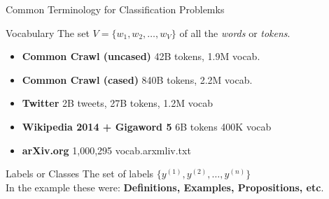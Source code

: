 \documentclass[9pt]{beamer}
\begin{document}
\begin{frame}{Common Terminology for Classification Problemks}
    \begin{exampleblock}{Vocabulary}
        The set $V = \{w_1,w_2,\ldots, w_V\}$ of all the \textit{words} or \textit{tokens}.
    \end{exampleblock}
        \begin{itemize}
            \item \textbf{Common Crawl (uncased)} 42B tokens, 1.9M vocab.
            \item \textbf{Common Crawl (cased)} 840B tokens, 2.2M vocab.
            \item \textbf{Twitter} 2B tweets, 27B tokens, 1.2M vocab
            \item \textbf{Wikipedia 2014 + Gigaword 5} 6B tokens 400K vocab
            \item \textbf{arXiv.org} 1,000,295 vocab.arxmliv.txt
        \end{itemize}

        \begin{exampleblock}{Labels or Classes}
            The set of labels $\{y^{(1)},y^{(2)},\ldots, y^{(n)}\}$\\
            In the example these were: \textbf{Definitions, Examples, Propositions, etc}.
        \end{exampleblock}


\end{frame}
\end{document}
